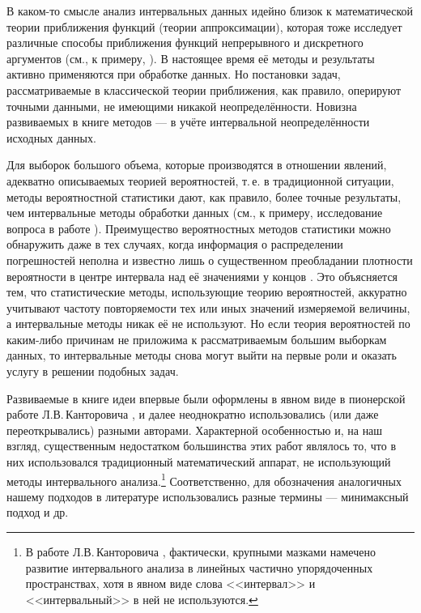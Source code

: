 \documentclass[a5paper,openany]{book}
\begin{document}
В каком-то смысле анализ интервальных данных идейно близок к математической теории 
приближения функций (теории аппроксимации), которая тоже исследует различные 
способы приближения функций непрерывного и дискретного аргументов (см., к примеру, 
\cite{Akhiezer,DemidMaronShuval,Remez}). В настоящее время её методы и результаты 
активно применяются при обработке данных. Но постановки задач, рассматриваемые 
в классической теории приближения, как правило, оперируют точными данными, 
не имеющими никакой неопределённости. Новизна развиваемых в книге методов 
--- в учёте интервальной неопределённости исходных данных. 
  
Для выборок большого объема, которые производятся в отношении явлений, адекватно 
описываемых теорией вероятностей, т.\,е. в традиционной ситуации, методы вероятностной 
статистики дают, как правило, более точные результаты, чем интервальные методы 
обработки данных (см., к примеру, исследование вопроса в работе \cite{ZhilinDiss}). 
Преимущество вероятностных методов статистики можно обнаружить даже в тех случаях, 
когда информация о распределении погрешностей неполна и известно лишь о существенном  
преобладании плотности вероятности в центре интервала над её значениями у концов 
\cite{Zhilin2003,OskorbinZhilinDronov}. Это объясняется тем, что статистические методы, 
использующие теорию вероятностей, аккуратно учитывают частоту повторяемости тех или 
иных значений измеряемой величины, а интервальные методы никак её не используют. 
Но если теория вероятностей по каким-либо причинам не приложима к рассматриваемым 
большим выборкам данных, то интервальные методы снова могут выйти на первые роли 
и оказать услугу в решении подобных задач. 
  
Развиваемые в книге идеи впервые были оформлены в явном виде в пионерской работе 
Л.В.\,Канторовича \cite{Kantorovich}, и далее неоднократно использовались (или 
даже переоткрывались) разными авторами. Характерной особенностью и, на наш взгляд, 
существенным недостатком большинства этих работ являлось то, что в них использовался 
традиционный математический аппарат, не использующий методы интервального 
анализа.\footnote{В работе Л.В.\,Канторовича  \cite{Kantorovich}, фактически, 
крупными мазками намечено развитие интервального анализа в линейных частично 
упорядоченных пространствах, хотя в явном виде слова <<интервал>> и <<интервальный>> 
в ней не используются.} Соответственно, для обозначения аналогичных нашему подходов 
в литературе использовались разные термины --- минимаксный подход и др. 
\end{document}
